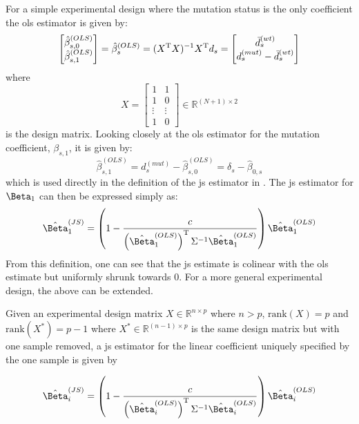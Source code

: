For a simple experimental design where the mutation status is the only coefficient the \gls{ols} estimator is given by:
%
\begin{equation*}
  \begin{bmatrix}
    \hat{\beta}_{s,0}^{(OLS)} \\
    \hat{\beta}_{s,1}^{(OLS)}
  \end{bmatrix}
  = \hat{\beta}_s^{(OLS)}
  = (X^{\mathrm{T}} X)^{-1}X^{\mathrm{T}} d_s
  = \begin{bmatrix}
    \bar{d}_s^{(wt)} \\
    d_s^{(mut)} - \bar{d}_s^{(wt)}
  \end{bmatrix}
\end{equation*}
%
where
%
\begin{equation*}
  X = \begin{bmatrix}
    1      & 1      \\
    1      & 0      \\
    \vdots & \vdots \\
    1      & 0
  \end{bmatrix}
  \in \mathbb{R}^{(N + 1) \times 2}
\end{equation*}
%
is the design matrix.
Looking closely at the \gls{ols} estimator for the mutation coefficient, $\beta_{s,1}$, it is given by:
%
\begin{equation}
  \hat{\beta}_{s,1}^{(OLS)} = d_s^{(mut)} - \hat{\beta}_{s,0}^{(OLS)} = \delta_s - \hat{\beta}_{0,s}
\end{equation}
%
which is used directly in the definition of the \gls{js} estimator in .
The \gls{js} estimator for $\Beta_1$ can then be expressed simply as:
%
\begin{equation}
  \hat{\Beta}_1^{(JS)} = \left( 1 - \frac{c}{\left( \hat{\Beta}_1^{(OLS)} \right)^\tran \Sigma^{-1} \hat{\Beta}_1^{(OLS)}} \right) \hat{\Beta}_1^{(OLS)}
  \label{eqn:js_defn_ols}
\end{equation}
%
From this definition, one can see that the \gls{js} estimate is colinear with the \gls{ols} estimate but uniformly shrunk towards 0.
For a more general experimental design, the above can be extended.

\begin{theorem}
  Given an experimental design matrix $X \in \mathbb{R}^{n \times p}$ where $n > p$, $\text{rank}(X) = p$ and $\text{rank}(X^*) = p - 1$ where $X^* \in \mathbb{R}^{(n - 1) \times p}$ is the same design matrix but with one sample removed, a \gls{js} estimator for the linear coefficient uniquely specified by the one sample is given by

  \begin{equation*}
    \hat{\Beta}_i^{(JS)} = \left( 1 - \frac{c}{\left( \hat{\Beta}_i^{(OLS)} \right)^\tran \Sigma^{-1} \hat{\Beta}_i^{(OLS)}} \right) \hat{\Beta}_i^{(OLS)}
  \end{equation*}
\end{theorem}


